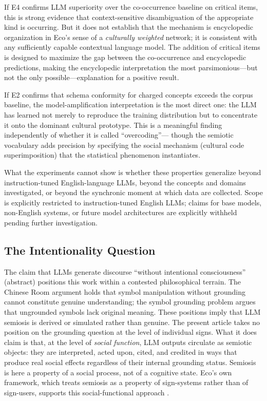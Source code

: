 \documentclass[12pt,a4paper]{article}
\begin{document}
If E4 confirms LLM superiority over the co-occurrence baseline on critical
items, this is strong evidence that context-sensitive disambiguation of the
appropriate kind is occurring. But it does not establish that the mechanism
is encyclopedic organization in Eco's sense of a \emph{culturally weighted}
network; it is consistent with any sufficiently capable contextual language
model. The addition of critical items is designed to maximize the gap between
the co-occurrence and encyclopedic predictions, making the encyclopedic
interpretation the most parsimonious---but not the only possible---explanation
for a positive result.

If E2 confirms that schema conformity for charged concepts exceeds the
corpus baseline, the model-amplification interpretation is the most direct
one: the LLM has learned not merely to reproduce the training distribution
but to concentrate it onto the dominant cultural prototype. This is a
meaningful finding independently of whether it is called ``overcoding''---
though the semiotic vocabulary adds precision by specifying the social mechanism
(cultural code superimposition) that the statistical phenomenon instantiates.

What the experiments cannot show is whether these properties generalize beyond
instruction-tuned English-language LLMs, beyond the concepts and domains
investigated, or beyond the synchronic moment at which data are collected.
Scope is explicitly restricted to instruction-tuned English LLMs; claims for
base models, non-English systems, or future model architectures are explicitly
withheld pending further investigation.

\subsection{The Intentionality Question}

The claim that LLMs generate discourse ``without intentional consciousness''
(abstract) positions this work within a contested philosophical terrain.
The Chinese Room argument \citep{Searle1980} holds that symbol manipulation
without grounding cannot constitute genuine understanding; the symbol grounding
problem \citep{Harnad1990} argues that ungrounded symbols lack original meaning.
These positions imply that LLM semiosis is derived or simulated rather than
genuine. The present article takes no position on the grounding question at
the level of individual signs. What it does claim is that, at the level of
\emph{social function}, LLM outputs circulate as semiotic objects: they are
interpreted, acted upon, cited, and credited in ways that produce real
social effects regardless of their internal grounding status. Semiosis is
here a property of a social process, not of a cognitive state. Eco's own
framework, which treats semiosis as a property of sign-systems rather than
of sign-users, supports this social-functional approach
\citep{Eco1976,Eco1979}.
\end{document}

